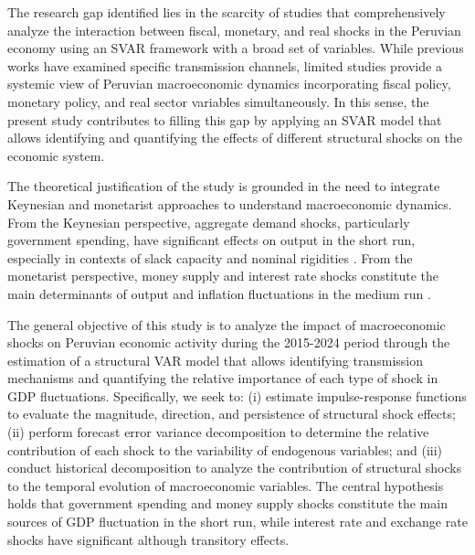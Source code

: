 \documentclass[12pt, a4paper]{article}
\begin{document}
The research gap identified lies in the scarcity of studies that comprehensively analyze the interaction between fiscal, monetary, and real shocks in the Peruvian economy using an SVAR framework with a broad set of variables. While previous works have examined specific transmission channels, limited studies provide a systemic view of Peruvian macroeconomic dynamics incorporating fiscal policy, monetary policy, and real sector variables simultaneously. In this sense, the present study contributes to filling this gap by applying an SVAR model that allows identifying and quantifying the effects of different structural shocks on the economic system.

The theoretical justification of the study is grounded in the need to integrate Keynesian and monetarist approaches to understand macroeconomic dynamics. From the Keynesian perspective, aggregate demand shocks, particularly government spending, have significant effects on output in the short run, especially in contexts of slack capacity and nominal rigidities \citep{blanchard2002, fatas2001, auerbach2012, romerbernstein2009, parker2011}. From the monetarist perspective, money supply and interest rate shocks constitute the main determinants of output and inflation fluctuations in the medium run \citep{friedman1968, lucas1972, sargent1975, barro1977, mccallum1989}.

The general objective of this study is to analyze the impact of macroeconomic shocks on Peruvian economic activity during the 2015-2024 period through the estimation of a structural VAR model that allows identifying transmission mechanisms and quantifying the relative importance of each type of shock in GDP fluctuations. Specifically, we seek to: (i) estimate impulse-response functions to evaluate the magnitude, direction, and persistence of structural shock effects; (ii) perform forecast error variance decomposition to determine the relative contribution of each shock to the variability of endogenous variables; and (iii) conduct historical decomposition to analyze the contribution of structural shocks to the temporal evolution of macroeconomic variables. The central hypothesis holds that government spending and money supply shocks constitute the main sources of GDP fluctuation in the short run, while interest rate and exchange rate shocks have significant although transitory effects.

\end{document}
